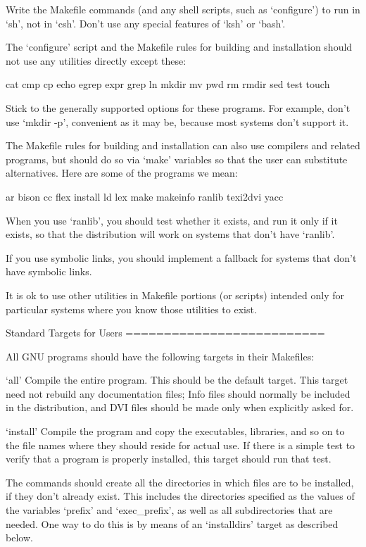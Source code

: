    Write the Makefile commands (and any shell scripts, such as
`configure') to run in `sh', not in `csh'.  Don't use any special
features of `ksh' or `bash'.

   The `configure' script and the Makefile rules for building and
installation should not use any utilities directly except these:

     cat cmp cp echo egrep expr grep
     ln mkdir mv pwd rm rmdir sed test touch

   Stick to the generally supported options for these programs.  For
example, don't use `mkdir -p', convenient as it may be, because most
systems don't support it.

   The Makefile rules for building and installation can also use
compilers and related programs, but should do so via `make' variables
so that the user can substitute alternatives.  Here are some of the
programs we mean:

     ar bison cc flex install ld lex
     make makeinfo ranlib texi2dvi yacc

   When you use `ranlib', you should test whether it exists, and run it
only if it exists, so that the distribution will work on systems that
don't have `ranlib'.

   If you use symbolic links, you should implement a fallback for
systems that don't have symbolic links.

   It is ok to use other utilities in Makefile portions (or scripts)
intended only for particular systems where you know those utilities to
exist.

Standard Targets for Users
==========================

   All GNU programs should have the following targets in their
Makefiles:

`all'
     Compile the entire program.  This should be the default target.
     This target need not rebuild any documentation files; Info files
     should normally be included in the distribution, and DVI files
     should be made only when explicitly asked for.

`install'
     Compile the program and copy the executables, libraries, and so on
     to the file names where they should reside for actual use.  If
     there is a simple test to verify that a program is properly
     installed, this target should run that test.

     The commands should create all the directories in which files are
     to be installed, if they don't already exist.  This includes the
     directories specified as the values of the variables `prefix' and
     `exec_prefix', as well as all subdirectories that are needed.  One
     way to do this is by means of an `installdirs' target as described
     below.

